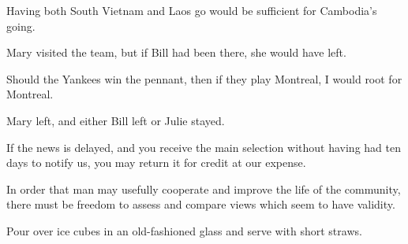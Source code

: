 \begin{enumerate}
	\begin{statement}{Having both South Vietnam and Laos go would be sufficient for Cambodia’s going.}
	\end{statement}

	\begin{statement}{Mary visited the team, but if Bill had been there, she would have left.}
	\end{statement}

	\begin{statement}{Should the Yankees win the pennant, then if they play Montreal, I would root for Montreal.}
	\end{statement}

	\begin{statement}{Mary left, and either Bill left or Julie stayed.}
	\end{statement}

	\begin{statement}{If the news is delayed, and you receive the main selection without having had ten days to notify us, you may return it for credit at our expense.}
	\end{statement}

	\begin{statement}{In order that man may usefully cooperate and improve the life of the community, there must be freedom to assess and compare views which seem to have validity.}
	\end{statement}

	\begin{statement}{Pour over ice cubes in an old-fashioned glass and serve with short straws.}
	\end{statement}


\end{enumerate}
